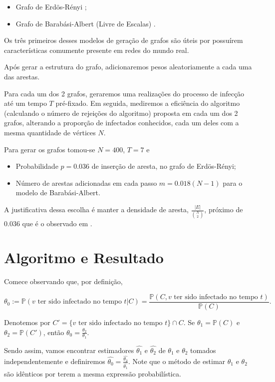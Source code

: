 \documentclass{article}
\newcommand{\Pp}{\mathbb{P}}
\begin{document}
\begin{itemize}
    \item Grafo de Erdös-Rényi \cite{Erdos, ErdosNx};
    \item Grafo de Barabási-Albert (Livre de Escalas) \cite{barabasi, barbasiNx}.
\end{itemize}

Os três primeiros desses modelos de geração de grafos são úteis por possuírem características comumente presente em redes do mundo real.

Após gerar a estrutura do grafo, adicionaremos pesos aleatoriamente a cada uma das arestas.

Para cada um dos 2 grafos, geraremos uma realizações do processo de infecção até um tempo $T$ pré-fixado. Em seguida, mediremos a eficiência do algoritmo (calculando o número de rejeições do algoritmo) proposta em cada um dos 2 grafos, alterando a proporção de infectados conhecidos, cada um deles com a mesma quantidade de vértices $N$.

Para gerar os grafos tomou-se $N = 400$, $T=7$ e

\begin{itemize}
    \item Probabilidade $p = 0.036$ de inserção de aresta, no grafo de Erdös-Rényi;
    \item Número de arestas adicionadas em cada passo $m = 0.018(N-1)$ para o modelo de Barabási-Albert.
\end{itemize} 

A justificativa dessa escolha é manter a densidade de aresta, $\frac{|E|}{\binom{N}{2}}$, próximo de $0.036$ que é o observado em \cite{Main2}.

\section{Algoritmo e Resultado}

Comece observando que, por definição, 

\[\theta_0 := \Pp(v \textrm{ ter sido infectado no tempo }  t|C) = \frac{\Pp(C, v \textrm{ ter sido infectado no tempo }  t)}{\Pp(C)}. \]

Denotemos por $C' = \{v \textrm{ ter sido infectado no tempo }  t\} \cap C$. Se $\theta_1 = \Pp(C)$ e $\theta_2 = \Pp(C')$, então $\theta_0 = \frac{\theta_2}{\theta_1}$.

Sendo assim, vamos encontrar estimadores $\hat{\theta_1}$ e $\hat{\theta_2}$ de $\theta_1$ e $\theta_2$ tomados independentemente e definiremos $\hat{\theta_0} = \frac{\hat{\theta_2}}{\hat{\theta_1}}$. Note que o método de estimar $\theta_1$ e $\theta_2$ são idênticos por terem a mesma expressão probabilística. 
\end{document}

